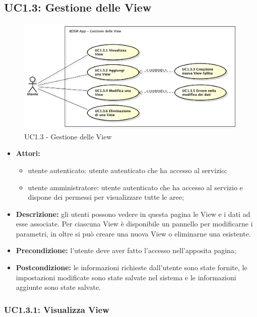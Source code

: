 \pagebreak
\subsection{UC1.3: Gestione delle View}

\begin{figure}[!htbp]
    \centering
    \centerline{\includegraphics[scale=0.45]{./images/UC1_3.pdf}}
    \caption{UC1.3 - Gestione delle View}
\end{figure}

\begin{itemize}
    \item \textbf{Attori:}
    \begin{itemize}
    	\item utente autenticato: utente autenticato che ha accesso al servizio;
    	\item utente amministratore: utente autenticato che ha accesso al servizio e dispone dei permessi per visualizzare tutte le aree;
	\end{itemize}
	 \item \textbf{Descrizione:} gli utenti possono vedere in questa pagina le View e i dati ad esse associate. Per ciascuna View è disponibile un pannello per modificarne i parametri, in oltre si può creare una nuova View o eliminarne una esistente.

    \item \textbf{Precondizione:} l'utente deve aver fatto l'accesso nell'apposita pagina;
    \item \textbf{Postcondizione:} le informazioni richieste dall'utente sono state fornite, le impostazioni modificate sono state salvate nel sistema e le informazioni aggiunte sono state salvate.

\end{itemize}

\subsubsection{UC1.3.1: Visualizza View}

